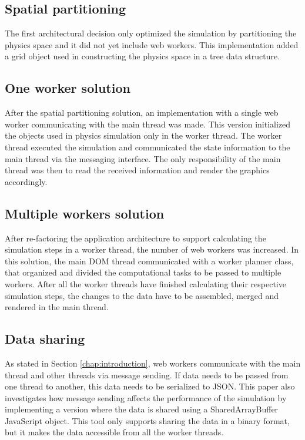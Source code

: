 \documentclass[conference]{IEEEtran}
\begin{document}
\subsection{Spatial partitioning} 
\label{sec:spatial}

The first architectural decision only optimized the simulation by partitioning the physics space and it did not yet include web workers. This implementation added a grid object used in constructing the physics space in a tree data structure.

\subsection{One worker solution} 
\label{sec:1workers}

After the spatial partitioning solution, an implementation with a single web worker communicating with the main thread was made. This version initialized the objects used
in physics simulation only in the worker thread. The worker thread executed the simulation and communicated the state information to the main thread via the messaging 
interface. The only responsibility of the main thread was then to read the received information and render the graphics accordingly.

\subsection{Multiple workers solution} 
\label{sec:nworkers}

After re-factoring the application architecture to support calculating the simulation steps in a worker thread, the number of web workers was increased. In this solution,
the main DOM thread communicated with a worker planner class, that organized and divided the computational tasks to be passed to multiple workers. After all the worker
threads have finished calculating their respective simulation steps, the changes to the data have to be assembled, merged and rendered in the main thread.

\subsection{Data sharing}

As stated in Section \ref{chap:introduction}, web workers communicate with the main thread and other threads via message sending. If data needs to be passed from one thread
to another, this data needs to be serialized to JSON. This paper also investigates how message sending affects the performance of the simulation by implementing a version
where the data is shared using a SharedArrayBuffer JavaScript object. This tool only supports sharing the data in a binary format, but it makes the data accessible from all the worker threads.
\end{document}
